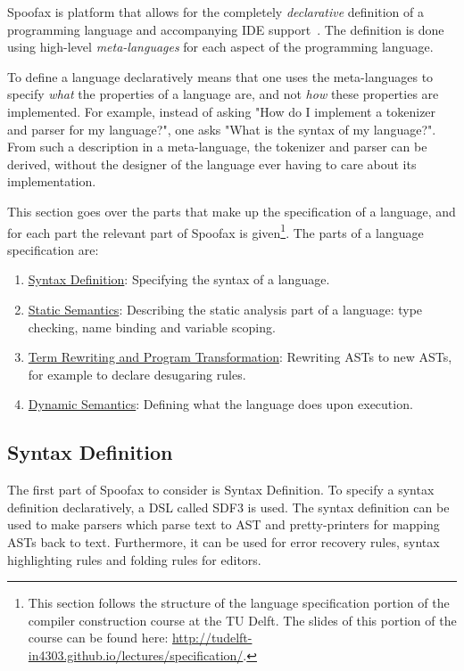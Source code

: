 Spoofax is platform that allows for the completely \emph{declarative}
definition of a programming language and accompanying IDE
support~\cite{KatsV10}. The definition is done using high-level
\emph{meta-languages} for each aspect of the programming language.

To define a language declaratively means that one uses the
meta-languages to specify \emph{what} the properties of a language are, and
not \emph{how} these properties are implemented. For example, instead of
asking "How do I implement a tokenizer and parser for my language?",
one asks "What is the syntax of my language?". From such a description
in a meta-language, the tokenizer and parser can be derived, without
the designer of the language ever having to care about its
implementation.

This section goes over the parts that make up the specification of a
language, and for each part the relevant part of Spoofax is
given\footnote{This section follows the structure of the
language specification portion of the compiler construction course at
the TU Delft. The slides of this portion of the course can be found
here: \url{http://tudelft-in4303.github.io/lectures/specification/}.}. The
parts of a language specification are:
\begin{enumerate}
\item \hyperref[sec-syntax-def]{Syntax Definition}: Specifying the syntax of a language.
\item \hyperref[sec-static-analysis]{Static Semantics}: Describing the static analysis part of a
language: type checking, name binding and variable scoping.
\item \hyperref[sec-term-rewrite]{Term Rewriting and Program Transformation}: Rewriting ASTs to new
ASTs, for example to declare desugaring rules.
\item \hyperref[sec-dynamic-semantics]{Dynamic Semantics}: Defining what the language does upon execution.
\end{enumerate}

\subsection{Syntax Definition}
\label{sec-syntax-def}
The first part of Spoofax to consider is Syntax Definition. To specify
a syntax definition declaratively, a DSL called SDF3 is used. The
syntax definition can be used to make parsers which parse text to AST
and pretty-printers for mapping ASTs back to text. Furthermore, it can
be used for error recovery rules, syntax highlighting rules and
folding rules for editors.

